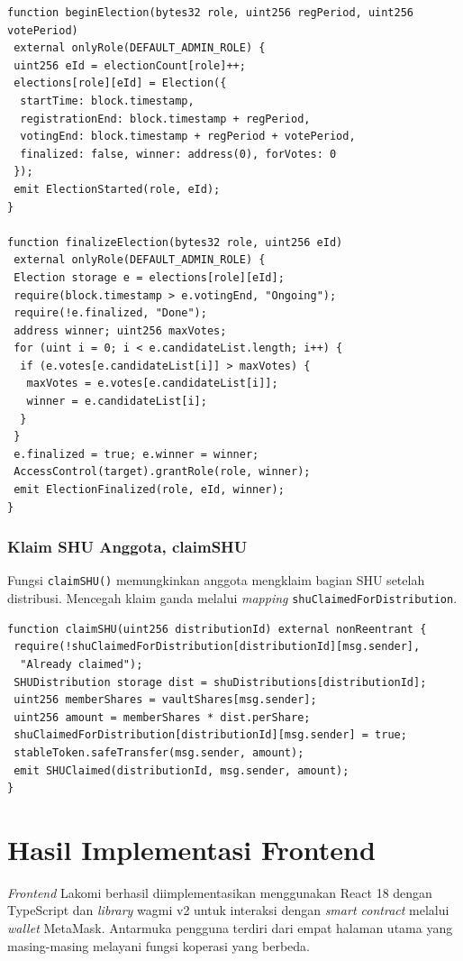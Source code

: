 \begin{lstlisting}
function beginElection(bytes32 role, uint256 regPeriod, uint256 votePeriod) 
 external onlyRole(DEFAULT_ADMIN_ROLE) {
 uint256 eId = electionCount[role]++;
 elections[role][eId] = Election({
  startTime: block.timestamp,
  registrationEnd: block.timestamp + regPeriod,
  votingEnd: block.timestamp + regPeriod + votePeriod,
  finalized: false, winner: address(0), forVotes: 0
 });
 emit ElectionStarted(role, eId);
}

function finalizeElection(bytes32 role, uint256 eId)
 external onlyRole(DEFAULT_ADMIN_ROLE) {
 Election storage e = elections[role][eId];
 require(block.timestamp > e.votingEnd, "Ongoing");
 require(!e.finalized, "Done");
 address winner; uint256 maxVotes;
 for (uint i = 0; i < e.candidateList.length; i++) {
  if (e.votes[e.candidateList[i]] > maxVotes) {
   maxVotes = e.votes[e.candidateList[i]];
   winner = e.candidateList[i];
  }
 }
 e.finalized = true; e.winner = winner;
 AccessControl(target).grantRole(role, winner);
 emit ElectionFinalized(role, eId, winner);
}
\end{lstlisting}

\subsubsection[Klaim SHU Anggota]{Klaim SHU Anggota, claimSHU}

Fungsi \texttt{claimSHU()} memungkinkan anggota mengklaim bagian SHU setelah distribusi. Mencegah klaim ganda melalui \textit{mapping} \texttt{shuClaimedForDistribution}.

\begin{lstlisting}
function claimSHU(uint256 distributionId) external nonReentrant {
 require(!shuClaimedForDistribution[distributionId][msg.sender],
  "Already claimed");
 SHUDistribution storage dist = shuDistributions[distributionId];
 uint256 memberShares = vaultShares[msg.sender];
 uint256 amount = memberShares * dist.perShare;
 shuClaimedForDistribution[distributionId][msg.sender] = true;
 stableToken.safeTransfer(msg.sender, amount);
 emit SHUClaimed(distributionId, msg.sender, amount);
}
\end{lstlisting}

\section{Hasil Implementasi Frontend}

\textit{Frontend} Lakomi berhasil diimplementasikan menggunakan React 18 dengan TypeScript dan \textit{library} wagmi v2 untuk interaksi dengan \textit{smart contract} melalui \textit{wallet} MetaMask. Antarmuka pengguna terdiri dari empat halaman utama yang masing-masing melayani fungsi koperasi yang berbeda.

